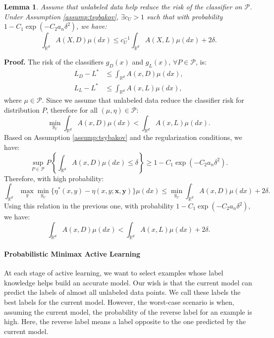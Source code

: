 \documentclass[12pt]{article}
\newtheorem{lemma}{Lemma}[section]
\begin{document}
	\begin{lemma}
		Assume that unlabeled data help reduce the risk of the classifier on $\mathcal{P}$. Under Assumption \ref{assump:tsybakov}, $\exists c_U > 1$ such that with probability $1 - C_1 \exp(-C_2 a_n \delta^2)$, we have:
		\begin{equation}
			\int_{\mathbb{R}^d} A(X, D) \mu(dx) \le c_U^{-1} \int_{\mathbb{R}^d} A(X, L) \mu(dx) + 2\delta.
		\end{equation}
	\end{lemma}
	
	\textbf{Proof.} The risk of the classifiers $g_D(x)$ and $g_L(x)$, $\forall P \in \mathcal{P}$, is:
	\begin{align}
		L_D - L^* &\le \int_{\mathbb{R}^d} A(x, D) \mu(dx), \\
		L_L - L^* &\le \int_{\mathbb{R}^d} A(x, L) \mu(dx),
	\end{align}
	where $\mu \in \mathcal{P}$. Since we assume that unlabeled data reduce the classifier risk for distribution $P$, therefore for all $(\mu, \eta) \in \mathcal{P}$:
	\begin{equation}
		\min_{y_U} \int_{\mathbb{R}^d} A(x, D) \mu(dx) < \int_{\mathbb{R}^d} A(x, L) \mu(dx).
	\end{equation}
	Based on Assumption \ref{assump:tsybakov} and the regularization conditions, we have:
	\begin{equation}
		\sup_{P \in \mathcal{P}} P\left\{ \int_{\mathbb{R}^d} A(x, D) \mu(dx) \le \delta \right\} \ge 1 - C_1 \exp(-C_2 a_n \delta^2).
	\end{equation}
	Therefore, with high probability:
	\begin{equation}
		\int_{\mathbb{R}^d} \max_y \min_{y_U} \{\eta^*(x, y) - \eta(x, y; \mathbf{x}, \mathbf{y})\} \mu(dx) \le \min_{y_U} \int_{\mathbb{R}^d} A(x, D) \mu(dx) + 2\delta.
	\end{equation}
	Using this relation in the previous one, with probability $1 - C_1 \exp(-C_2 a_n \delta^2)$, we have:
	\begin{equation}
		\int_{\mathbb{R}^d} A(x, D) \mu(dx) < \int_{\mathbb{R}^d} A(x, L) \mu(dx) + 2\delta.
	\end{equation}
	
	\paragraph{Probabilistic Minimax Active Learning}
	At each stage of active learning, we want to select examples whose label knowledge helps build an accurate model. Our wish is that the current model can predict the labels of almost all unlabeled data points. We call these labels the best labels for the current model. However, the worst-case scenario is when, assuming the current model, the probability of the reverse label for an example is high. Here, the reverse label means a label opposite to the one predicted by the current model.
	
\end{document}
